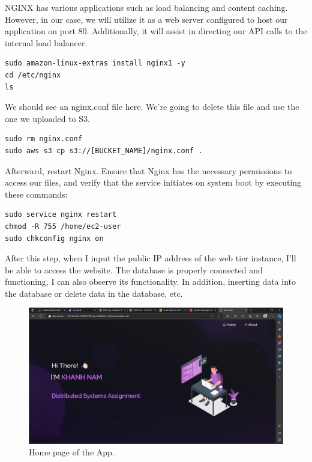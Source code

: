 \documentclass{article}
\begin{document}
NGINX has various applications such as load balancing and content caching. However, in our case, we will utilize it as a web server configured to host our application on port 80. Additionally, it will assist in directing our API calls to the internal load balancer.\par

\begin{lstlisting}
sudo amazon-linux-extras install nginx1 -y
cd /etc/nginx
ls
\end{lstlisting}

We should see an nginx.conf file here. We’re going to delete this file and use the one we uploaded to S3.\par
\begin{lstlisting}
sudo rm nginx.conf
sudo aws s3 cp s3://[BUCKET_NAME]/nginx.conf .
\end{lstlisting}

Afterward, restart Nginx. Ensure that Nginx has the necessary permissions to access our files, and verify that the service initiates on system boot by executing these commands:\par
\begin{lstlisting}
sudo service nginx restart
chmod -R 755 /home/ec2-user
sudo chkconfig nginx on
\end{lstlisting}

After this step, when I input the public IP address of the web tier instance, I'll be able to access the website. The database is properly connected and functioning, I can also observe its functionality. In addition, inserting data into the database or delete data in the database, etc.\par

\begin{figure}[h]
    \centering
    \includegraphics[width=12cm]{Pictures/Internet/Result_1.png}
    \caption{Home page of the App.}
    \label{fig:enter-label}
\end{figure}
\end{document}
